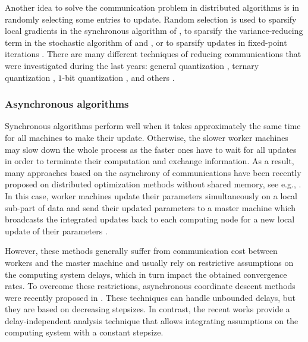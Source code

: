 Another idea to solve the communication problem in distributed algorithms is in randomly selecting some entries to update. Random selection is used to sparsify local gradients in the synchronous algorithm of \cite{wangni2018gradient}, to sparsify the variance-reducing term in the stochastic algorithm of \cite{leblond2016asaga} and \cite{pedregosa2017breaking}, or to sparsify updates in fixed-point iterations \cite{peng2016arock}. There are many different techniques of reducing communications that were investigated during the last years:  general quantization \cite{alistarh2017qsgd, horvath2019stochastic, koloskova2019decentralized}, ternary quantization \cite{wen2017terngrad}, $1$-bit quantization \cite{bernstein2018signsgd}, and others \cite{ben2019demystifying, lin2017deep}.



\subsubsection{Asynchronous algorithms}
Synchronous algorithms perform well when it takes approximately the same time for all machines to make their update. Otherwise, the slower worker machines may slow down the whole process as the faster ones have to wait for all updates in order to terminate their computation and exchange information. As a result, many approaches based on the asynchrony of communications have been recently proposed on distributed optimization methods without shared memory, see e.g., \;\cite{zhang2014asynchronous,ma2015adding,aytekin2016analysis,peng2016arock,calauzenes2017distributed}. In this case, worker machines update their parameters simultaneously on a local sub-part of data and send their updated parameters to a master machine which broadcasts the integrated updates back to each computing node for a new local update of their parameters \cite{li2013distributed,konevcny2016federated,ICML18}.


However, these methods generally suffer from communication cost between workers and the master machine and usually rely on restrictive assumptions on the computing system delays, which in turn impact the obtained convergence rates. To overcome these restrictions, asynchronous coordinate descent methods were recently proposed in \cite{hannah2016unbounded,sun2017asynchronous}. These techniques can handle unbounded delays, but they are based on decreasing stepsizes. In contrast, the recent works \cite{ICML18,mishchenko2018} provide a delay-independent analysis technique that allows integrating assumptions on the computing system with a constant stepsize.

